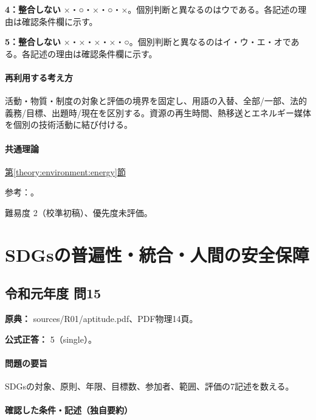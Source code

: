 \noindent\textbf{4：整合しない} ×・○・×・○・×。個別判断と異なるのはウである。各記述の理由は確認条件欄に示す。\par

\noindent\textbf{5：整合しない} ×・×・×・×・○。個別判断と異なるのはイ・ウ・エ・オである。各記述の理由は確認条件欄に示す。\par

\paragraph{再利用する考え方} 活動・物質・制度の対象と評価の境界を固定し、用語の入替、全部/一部、法的義務/目標、出題時/現在を区別する。資源の再生時間、熱移送とエネルギー媒体を個別の技術活動に結び付ける。

\paragraph{共通理論} \hyperref[theory:environment:energy]{第\ref*{theory:environment:energy}節}

\par 参考：\cite{env_renewable2022,env_hydrogen2015,env_biomass,env_paris}。

\par 難易度 2（校準初稿）、優先度未評価。

\section{SDGsの普遍性・統合・人間の安全保障}

\subsection{令和元年度 問15}
\label{q:r01-reg-apt-15}

\noindent\textbf{原典：} sources/R01/aptitude.pdf、PDF物理14頁。

\textbf{公式正答：} 5（single）。

\paragraph{問題の要旨} SDGsの対象、原則、年限、目標数、参加者、範囲、評価の7記述を数える。

\paragraph{確認した条件・記述（独自要約）}\mbox{}\par

